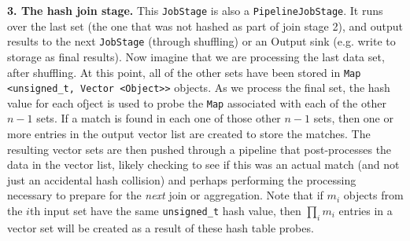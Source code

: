 \vspace{5pt}
{\bf 3. The hash join stage.} 
This \texttt{JobStage} is also a \texttt{PipelineJobStage}. It runs over the last set (the one that was not 
hashed as part of join stage 2), and output results to the next
\texttt{JobStage} (through shuffling) or an Output sink (e.g. write to storage
as final results). Now imagine that we are processing the last data set, after shuffling.  At this point,
all of the other sets have been
stored in \texttt{Map <unsigned\_t, Vector <Object>>} objects.  As we process the final set,
the hash value for each ofject is used to probe the \texttt{Map}
associated with each of the other $n-1$ sets.  If a match is found in each one of those other $n-1$ sets, then
one or more entries in the output vector list are created to store the matches.  The resulting vector sets are then pushed through a pipeline that post-processes
the data in the vector list, likely checking to see if this was an actual match (and not just an accidental hash collision) and perhaps performing the processing
necessary to prepare for the \emph{next} join or aggregation.
Note that if $m_i$ objects from the $i$th input set have the same \texttt{unsigned\_t} hash value, then $\prod_i m_i$ entries in a vector set will be created
as a result of these hash table probes. 

%
%
%
